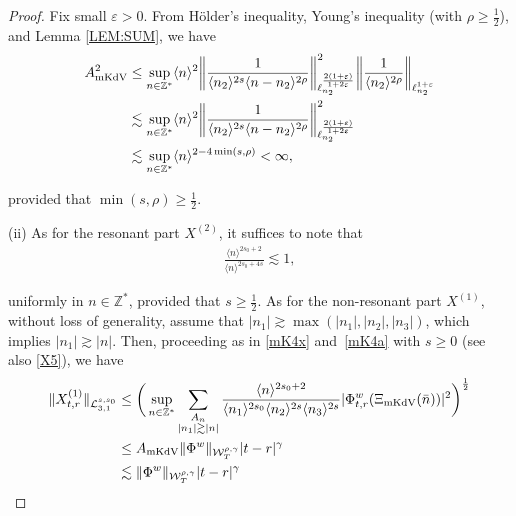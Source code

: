 \documentclass[letterpaper, 11pt,  reqno]{amsart}
\newcommand{\1}{\hspace{0.5mm}\text{I}\hspace{0.5mm}}
\newcommand{\noi}{\noindent}
\newcommand{\Z}{\mathbb{Z}}
\newcommand{\eps}{\varepsilon}
\newcommand{\g}{\gamma}
\renewcommand{\l}{\ell}
\newcommand{\les}{\lesssim}
\newcommand{\ges}{\gtrsim}
\newcommand{\jb}[1]
{\langle #1 \rangle}
\newcommand{\cL}{\mathcal{L}}
\newcommand{\W}{\mathcal{W}}
\newcommand{\MKDV}{\text{\rm mKdV} }
\numberwithin{equation}{section}
\numberwithin{theorem}{section}
\begin{document}
\begin{proof}
\noi
Fix small $\eps > 0$.
From H\"older's inequality, Young's inequality (with $\rho \ge \frac 12$),
and Lemma \ref{LEM:SUM}, 
 we have
\begin{align}
\begin{split}
 A_\MKDV^2 
& \le  \sup_{n\in \Z^*} \jb{n}^2
\bigg\| \frac1{\jb{n_2}^{2s}\jb{n - n_2}^{2\rho}}\bigg\|_{\l^\frac{2(1+\eps)}{1+2\eps}_{n_2}}^2
\bigg\| \frac1{\jb{n_2}^{2\rho}}\bigg\|_{\l^{1+\eps}_{n_2}}\\
& \les  \sup_{n\in \Z^*} \jb{n}^2
\bigg\| \frac1{\jb{n_2}^{2s}\jb{n - n_2}^{2\rho}}\bigg\|_{\l^\frac{2(1+\eps)}{1+2\eps}_{n_2}}^2\\
& \les 
\sup_{n\in \Z^*} 
\jb{n}^{2 - 4\min(s, \rho) } < \infty, 
\end{split}
\label{mK8}
\end{align}

\noi
\noi
provided that 
$\min(s, \rho)\ge \frac 12$.









\medskip

\noi
(ii) 
As for   the resonant part $X^{(2)}$, it suffices
to note that 
\begin{align*}
\frac{\jb{n}^{2s_0+2}}{\jb{n}^{2s_0 + 4s}}
\les 1, 
\end{align*}

\noi
uniformly in $n \in \Z^*$, 
provided that 
 $s \ge \frac 12$.
As for the non-resonant part $X^{(1)}$, 
without loss of generality,
assume that $|n_1| \ges \max (|n_1|, |n_2|,  |n_3|)$, 
which implies $|n_1|\ges |n|$.
%
%
%
Then, proceeding as in \eqref{mK4x} and~\eqref{mK4a}
with $s\ge 0$ (see also \eqref{X5}), 
we have 
\begin{align*}
\|X_{t,r}^{(1)}\|_{\cL_{3, 1}^{s, s_0}}
&\leq \bigg( \sup_{n\in \Z^*} 
\sum_{\substack{A_n\\|n_1|\ges |n|}}
\frac{\jb{n}^{2s_0+2} }{\jb{n_1}^{2s_0} \jb{n_2}^{2s}\jb{n_3}^{2s}}
|\Phi^{w}_{t,r}( \Xi_\MKDV (\bar n)) |^2\bigg)^\frac 12\\
&\leq A_\MKDV \| \Phi^w \|_{\W_T^{\rho,\g}}|t-r|^{\g}\\
&\les \| \Phi^w \|_{\W_T^{\rho,\g}}|t-r|^{\g}
\end{align*}




\end{proof}
\end{document}
